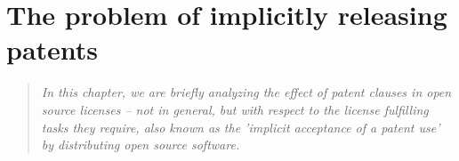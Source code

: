 %
%
%
%
%



\section{The problem of implicitly releasing patents}
\footnotesize \begin{quote}\itshape In this chapter, we are briefly analyzing
the effect of patent clauses in open source licenses -- not in general, but with
respect to the license fulfilling tasks they require, also known as the
'implicit acceptance of a patent use' by distributing open source software.
\end{quote}
\normalsize

